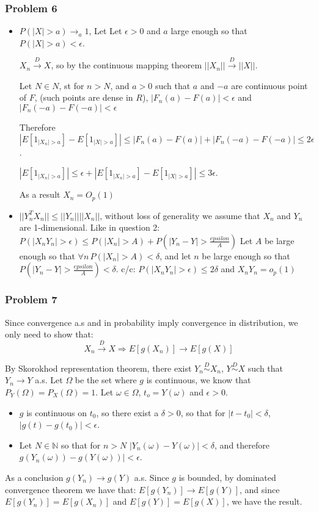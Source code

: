 \documentclass[12pt]{article}
\newcommand{\Q}[1]{\subsubsection*{Problem #1}}
\begin{document}
\Q{6}
\begin{itemize}
\item
  $P(|X| > a)  \rightarrow_a 1$, Let
  Let $\epsilon > 0$ and $a$ large enough so that $P(|X| > a) < \epsilon$.
  
  $X_n \overset{D}{\rightarrow} X$, so by the continuous mapping theorem $||X_n|| \overset{D}{\rightarrow} ||X||$.

  Let $N \in N$, st for
  $n > N$, and $a > 0$ such that $a$ and $-a$ are continuous point of $F$, (such points are dense in $R$),
  $|F_n(a) - F(a)| < \epsilon$ and $|F_n(-a) - F(-a)| < \epsilon$
  
  Therefore $|E[1_{|X_n| > a}] - E[1_{|X| > a}]|
  \le |F_n(a) - F(a)| + |F_n(-a) - F(-a)| \le 2 \epsilon$.
  
  $|E[1_{|X_n| > a}]| \le \epsilon + |E[1_{|X_n| > a}] - E[1_{|X| > a}]|
   \le 3\epsilon$.
  
  As a result $X_n = O_p(1)$

\item 
  $||Y_n^TX_n|| \le ||Y_n|| ||X_n||$, without loss of generality we assume that $X_n$ and $Y_n$ are 1-dimensional.
  Like in question 2:
  $P(|X_nY_n| > \epsilon) \le P(|X_n| > A) + P(|Y_n - Y| > \frac{epsilon}{A})$
  Let $A$ be large enough so that $\forall n \, P(|X_n| > A) < \delta$, and let $n$ be large enough so that $P(|Y_n - Y| > \frac{epsilon}{A}) < \delta$.
  c/c: $P(|X_nY_n| > \epsilon) \le 2 \delta$ and $X_nY_n = o_p(1)$

\end{itemize}
\Q{7}
Since convergence a.s and in probability imply convergence in distribution, we only need to show that:
$$X_n \overset{D}{\rightarrow} X \Rightarrow E[g(X_n)] \rightarrow E[g(X)]$$

By Skorokhod representation theorem, there exist $Y_n \overset{D}{\sim} X_n$, $Y \overset{D}{\sim} X$ such that $Y_n \rightarrow Y$ a.s.
Let $\Omega$ be the set where $g$ is continuous, we know that $P_Y(\Omega) = P_X(\Omega) = 1$. 
Let $\omega \in \Omega$, $t_o = Y(\omega)$ and $\epsilon > 0$.
\begin{itemize}
\item 
$g$ is continuous on $t_0$, so there exist a $\delta > 0$, so that for $|t - t_0| < \delta$, $|g(t) - g(t_0)| < \epsilon$.
\item 
Let $N \in \mathbb{N}$ so that for $n > N$
$|Y_n(\omega) - Y(\omega)| < \delta$, and therefore $g(Y_n(\omega)) - g(Y(\omega))| < \epsilon$.
\end{itemize}
As a conclusion $g(Y_n) \rightarrow g(Y)$ a.s.
Since $g$ is bounded, by dominated convergence theorem we have that: $E[g(Y_n)] \rightarrow E[g(Y)]$, and since $E[g(Y_n)] = E[g(X_n)]$ and $E[g(Y)] = E[g(X)]$, we have the result.
\end{document}
